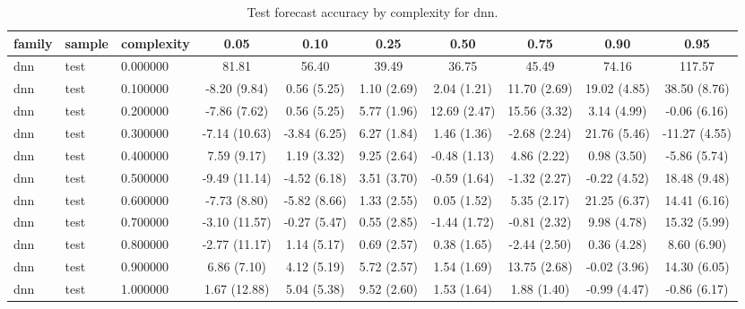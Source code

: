 \begin{table}
\caption{Test forecast accuracy by complexity for dnn.}
\label{tab:test_dnn}
\begin{tabular}{lllccccccc}
\toprule
family & sample & complexity & 0.05 & 0.10 & 0.25 & 0.50 & 0.75 & 0.90 & 0.95 \\
\midrule
dnn & test & 0.000000 & 81.81 & 56.40 & 39.49 & 36.75 & 45.49 & 74.16 & 117.57 \\
dnn & test & 0.100000 & -8.20
(9.84) & 0.56
(5.25) & 1.10
(2.69) & 2.04
(1.21) & 11.70
(2.69) & 19.02
(4.85) & 38.50
(8.76) \\
dnn & test & 0.200000 & -7.86
(7.62) & 0.56
(5.25) & 5.77
(1.96) & 12.69
(2.47) & 15.56
(3.32) & 3.14
(4.99) & -0.06
(6.16) \\
dnn & test & 0.300000 & -7.14
(10.63) & -3.84
(6.25) & 6.27
(1.84) & 1.46
(1.36) & -2.68
(2.24) & 21.76
(5.46) & -11.27
(4.55) \\
dnn & test & 0.400000 & 7.59
(9.17) & 1.19
(3.32) & 9.25
(2.64) & -0.48
(1.13) & 4.86
(2.22) & 0.98
(3.50) & -5.86
(5.74) \\
dnn & test & 0.500000 & -9.49
(11.14) & -4.52
(6.18) & 3.51
(3.70) & -0.59
(1.64) & -1.32
(2.27) & -0.22
(4.52) & 18.48
(9.48) \\
dnn & test & 0.600000 & -7.73
(8.80) & -5.82
(8.66) & 1.33
(2.55) & 0.05
(1.52) & 5.35
(2.17) & 21.25
(6.37) & 14.41
(6.16) \\
dnn & test & 0.700000 & -3.10
(11.57) & -0.27
(5.47) & 0.55
(2.85) & -1.44
(1.72) & -0.81
(2.32) & 9.98
(4.78) & 15.32
(5.99) \\
dnn & test & 0.800000 & -2.77
(11.17) & 1.14
(5.17) & 0.69
(2.57) & 0.38
(1.65) & -2.44
(2.50) & 0.36
(4.28) & 8.60
(6.90) \\
dnn & test & 0.900000 & 6.86
(7.10) & 4.12
(5.19) & 5.72
(2.57) & 1.54
(1.69) & 13.75
(2.68) & -0.02
(3.96) & 14.30
(6.05) \\
dnn & test & 1.000000 & 1.67
(12.88) & 5.04
(5.38) & 9.52
(2.60) & 1.53
(1.64) & 1.88
(1.40) & -0.99
(4.47) & -0.86
(6.17) \\
\bottomrule
\end{tabular}
\end{table}
